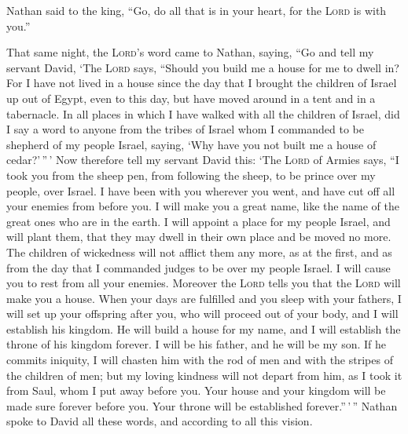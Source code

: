  Nathan said to the king, ``Go, do all that is in your
heart, for the \textsc{Lord} is with you.''

 That same night, the \textsc{Lord}'s word came to Nathan,
saying,  ``Go and tell my servant David, `The
\textsc{Lord} says, ``Should you build me a house for me to dwell in?
 For I have not lived in a house since the day that I
brought the children of Israel up out of Egypt, even to this day, but
have moved around in a tent and in a tabernacle.  In all
places in which I have walked with all the children of Israel, did I say
a word to anyone from the tribes of Israel whom I commanded to be
shepherd of my people Israel, saying, `Why have you not built me a house
of cedar?'\,''\,'  Now therefore tell my servant David
this: `The \textsc{Lord} of Armies says, ``I took you from the sheep
pen, from following the sheep, to be prince over my people, over Israel.
 I have been with you wherever you went, and have cut off
all your enemies from before you. I will make you a great name, like the
name of the great ones who are in the earth.  I will
appoint a place for my people Israel, and will plant them, that they may
dwell in their own place and be moved no more. The children of
wickedness will not afflict them any more, as at the first,
 and as from the day that I commanded judges to be over
my people Israel. I will cause you to rest from all your enemies.
Moreover the \textsc{Lord} tells you that the \textsc{Lord} will make
you a house.  When your days are fulfilled and you sleep
with your fathers, I will set up your offspring after you, who will
proceed out of your body, and I will establish his kingdom.
 He will build a house for my name, and I will establish
the throne of his kingdom forever.  I will be his father,
and he will be my son. If he commits iniquity, I will chasten him with
the rod of men and with the stripes of the children of men;
 but my loving kindness will not depart from him, as I
took it from Saul, whom I put away before you.  Your
house and your kingdom will be made sure forever before you. Your throne
will be established forever.''\,'\,''  Nathan spoke to
David all these words, and according to all this vision.

